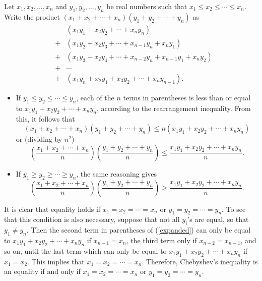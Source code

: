 \documentclass[12pt]{article}
\begin{document}
Let $x_1,x_2,\ldots,x_n$ and $y_1,y_2,\ldots,y_n$ be real numbers such
that $x_1\le x_2\le\cdots\le x_n$.  Write the product
$(x_1+x_2+\cdots+x_n)(y_1+y_2+\cdots+y_n)$ as
\begin{eqnarray}
\nonumber
&&(x_1y_1+x_2y_2+\cdots+x_ny_n)\\
\nonumber
&+&(x_1y_2+x_2y_3+\cdots+x_{n-1}y_n+x_ny_1)\\
\nonumber
&+&(x_1y_3+x_2y_4+\cdots+x_{n-2}y_n+x_{n-1}y_1+x_ny_2)\\
\nonumber
&+&\cdots\\
&+&(x_1y_n+x_2y_1+x_3y_2+\cdots+x_ny_{n-1}).
\label{expanded}
\end{eqnarray}
\begin{itemize}
\item
If $y_1\le y_2\le\cdots\le y_n$, each of the $n$ terms in parentheses
is less than or equal to $x_1y_1+x_2y_2+\cdots+x_ny_n$, according to
the rearrangement inequality.  From this, it follows that
$$
(x_1+x_2+\cdots+x_n)(y_1+y_2+\cdots+y_n)\le
n(x_1y_1+x_2y_2+\cdots+x_ny_n)
$$
or (dividing by $n^2$)
$$
\left(\frac{x_1+x_2+\cdots+x_n}{n}\right)
\left(\frac{y_1+y_2+\cdots+y_n}{n}\right)\le
\frac{x_1y_1+x_2y_2+\cdots+x_ny_n}{n}.
$$
\item
If $y_1\ge y_2\ge\cdots\ge y_n$, the same reasoning gives
$$
\left(\frac{x_1+x_2+\cdots+x_n}{n}\right)
\left(\frac{y_1+y_2+\cdots+y_n}{n}\right)\ge
\frac{x_1y_1+x_2y_2+\cdots+x_ny_n}{n}.
$$
\end{itemize}
It is clear that equality holds if $x_1=x_2=\cdots=x_n$ or
$y_1=y_2=\cdots=y_n$.  To see that this condition is also necessary,
suppose that not all $y_i$'s are equal, so that $y_1\neq y_n$.
Then the second term in parentheses of (\ref{expanded}) can only be
equal to $x_1y_1+x_2y_2+\cdots+x_ny_n$ if $x_{n-1}=x_n$, the third
term only if $x_{n-2}=x_{n-1}$, and so on, until the last term which
can only be equal to $x_1y_1+x_2y_2+\cdots+x_ny_n$ if $x_1=x_2$.  This
implies that $x_1=x_2=\cdots=x_n$.  Therefore, Chebyshev's inequality
is an equality if and only if $x_1=x_2=\cdots=x_n$ or
$y_1=y_2=\cdots=y_n$.
\end{document}
